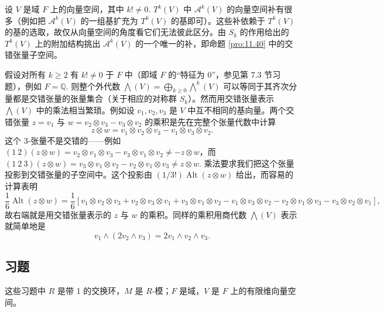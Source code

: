 \begin{example}
设 \(V\) 是域 \(F\) 上的向量空间，其中 \(k! \neq 0\). \(T^k(V)\) 中 \(\mathcal{A}^k(V)\) 的向量空间补有很多（例如把 \(\mathcal{A}^k(V)\) 的一组基扩充为 \(T^k(V)\) 的基即可）。这些补依赖于 \(T^k(V)\) 的基的选取，故仅从向量空间的角度看它们无法彼此区分。由 \(S_k\) 的作用给出的 \(T^k(V)\) 上的附加结构挑出 \(\mathcal{A}^k(V)\) 的一个唯一的补，即命题 \ref{pro:11.40} 中的交错张量子空间。

假设对所有 \(k \geq 2\) 有 \(k! \neq 0\) 于 \(F\) 中（即域 \(F\) 的“特征为 0”，参见第 7.3 节习题），例如 \(F = \mathbb{Q}\). 则整个外代数 \(\bigwedge(V) = \bigoplus_{k \geq 0}\bigwedge^k(V)\) 可以等同于其齐次分量都是交错张量的张量集合（关于相应的对称群 \(S_k\)）。然而用交错张量表示 \(\bigwedge(V)\) 中的乘法相当繁琐。例如设 \(v_1, v_2, v_3\) 是 \(V\) 中互不相同的基向量。两个交错张量 \(z = v_1\) 与 \(w = v_2 \otimes v_3-v_3 \otimes v_2\) 的乘积是先在完整个张量代数中计算
\[
z \otimes w = v_1 \otimes v_2 \otimes v_3 - v_1 \otimes v_3 \otimes v_2.
\]
这个 3-张量不是交错的——例如 \((1\ 2)(z \otimes w) = v_2 \otimes v_1 \otimes v_3-v_3 \otimes v_1 \otimes v_2 \neq -z \otimes w\)，而 \((1\ 2\ 3)(z \otimes w) = v_3 \otimes v_1 \otimes v_2-v_2 \otimes v_1 \otimes v_3 \neq z \otimes w\). 乘法要求我们把这个张量投影到交错张量的子空间中。这个投影由 \((1/3!)\operatorname{Alt}(z \otimes w)\) 给出，而容易的计算表明
\[
\frac{1}{6}\operatorname{Alt}(z \otimes w) = \frac{1}{6}[v_1 \otimes v_2 \otimes v_3+v_2 \otimes v_3 \otimes v_1+v_3 \otimes v_1 \otimes v_2-v_1 \otimes v_3 \otimes v_2-v_2 \otimes v_1 \otimes v_3-v_3 \otimes v_2 \otimes v_1],
\]
故右端就是用交错张量表示的 \(z\) 与 \(w\) 的乘积。同样的乘积用商代数 \(\bigwedge(V)\) 表示就简单地是
\[
v_1 \wedge (2v_2 \wedge v_3) = 2v_1 \wedge v_2 \wedge v_3.
\]
\end{example}

\subsection*{习题}

\noindent 这些习题中 \(R\) 是带 1 的交换环，\(M\) 是 \(R\)-模；\(F\) 是域，\(V\) 是 \(F\) 上的有限维向量空间。

